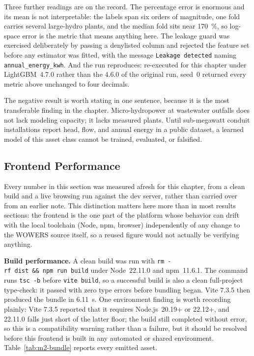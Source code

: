 \documentclass[12pt,letterpaper]{report}
\begin{document}
Three further readings are on the record. The percentage error is enormous and its
mean is not interpretable: the labels span six orders of magnitude, one fold
carries several large-hydro plants, and the median fold sits near 170~\%, so
log-space error is the metric that means anything here. The leakage guard was
exercised deliberately by passing a denylisted column and rejected the feature set
before any estimator was fitted, with the message \texttt{Leakage detected}
naming \texttt{annual\_energy\_kwh}. And the run reproduces: re-executed for this
chapter under LightGBM~4.7.0 rather than the 4.6.0 of the original run, seed~0
returned every metric above unchanged to four decimals.

The negative result is worth stating in one sentence, because it is the most
transferable finding in the chapter. Micro-hydropower at wastewater outfalls does
not lack modeling capacity; it lacks measured plants. Until sub-megawatt conduit
installations report head, flow, and annual energy in a public dataset, a learned
model of this asset class cannot be trained, evaluated, or falsified.

\subsection{Frontend Performance}                        %

Every number in this section was measured afresh for this chapter, from a
clean build and a live browsing run against the dev server, rather than
carried over from an earlier note. This distinction matters here more than
in most results sections: the frontend is the one part of the platform
whose behavior can drift with the local toolchain (Node, npm, browser)
independently of any change to the WOWERS source itself, so a reused
figure would not actually be verifying anything.

\textbf{Build performance.} A clean build was run with
\texttt{rm~-rf~dist~\&\&~npm~run~build} under Node~22.11.0 and npm~11.6.1.
The command runs \texttt{tsc~-b} before \texttt{vite~build}, so a
successful build is also a clean full-project type-check: it passed with
zero type errors before bundling began. Vite 7.3.5 then produced the
bundle in 6.11~s. One environment finding is worth recording plainly: Vite
7.3.5 reported that it requires Node.js~20.19+ or 22.12+, and 22.11.0
falls just short of the latter floor; the build still completed without
error, so this is a compatibility warning rather than a failure, but it
should be resolved before this frontend is built in any automated or
shared environment. Table~\ref{tab:m2-bundle} reports every emitted
asset.
\end{document}
